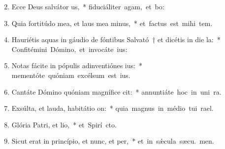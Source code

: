 \begin{flushleft}
\begin{enumerate}[leftmargin=*]
\setcounter{enumi}{1}

\item Ecce Deus salvátor us,~* \mbox{fiduciáliter agam, et  bo:}
\item Quia fortitúdo mea, et laus mea minus,~* \mbox{et factus est mihi  tem.}
\item Hauriétis aquas in gáudio de fóntibus Salvató~†  et dicétis in die la:~* \mbox{Confitémini Dómino, et invocáte  ius:}
\item Notas fácite in pópulis adinventiónes ius:~* \mbox{mementóte quóniam excélsum est  ius.}
\item Cantáte Dómino quóniam magnífice cit:~* \mbox{annuntiáte hoc in uni ra.}
\item Exsúlta, et lauda, habitátio on:~* \mbox{quia magnus in médio tui  rael.}
\item Glória Patri, et lio,~* \mbox{et Spirí cto.}
\item Sicut erat in princípio, et nunc, et per,~* \mbox{et in s\'{\ae}cula sæcu. men.}

\end{enumerate}
\end{flushleft}

